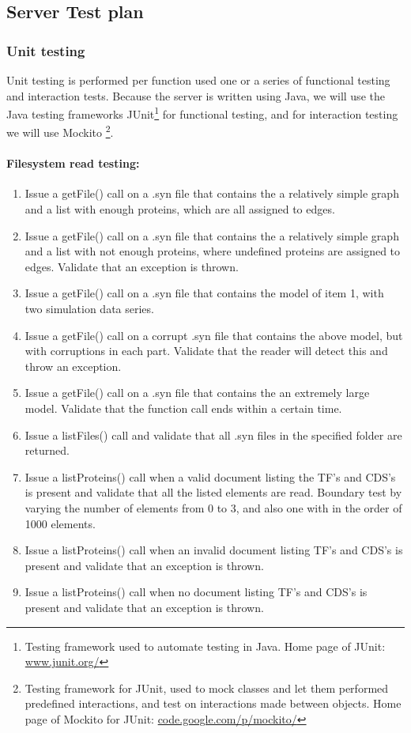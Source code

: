 \subsection{Server Test plan}

\subsubsection{Unit testing}
Unit testing is performed per function used one or a series of functional testing and interaction tests. Because the server is written using Java, we will use the Java testing frameworks JUnit\footnote{Testing framework used to automate testing in Java. Home page of JUnit: \url{www.junit.org/}} for functional testing, and for interaction testing we will use Mockito \footnote{Testing framework for JUnit, used to mock classes and let them performed predefined interactions, and test on interactions made between objects. Home page of Mockito for JUnit: \url{code.google.com/p/mockito/}}.

\paragraph{Filesystem read testing:}

\begin{enumerate}
\item Issue a getFile() call on a .syn file that contains the a relatively simple graph  and a list with enough proteins, which are all assigned to edges.

\item Issue a getFile() call on a .syn file that contains the a relatively simple graph  and a list with not enough proteins, where undefined proteins are assigned to edges. Validate that an exception is thrown.\item Issue a getFile() call on  a .syn file that contains the  model of item 1, with two simulation data series.
\item Issue a getFile() call on  a corrupt .syn file that contains the above model, but with corruptions in each part.
Validate that the reader will detect this and throw an exception.
\item Issue a getFile() call on  a .syn file that contains the an extremely large model. Validate that the function call ends within a certain time. 
\item Issue a listFiles() call and validate that all .syn files in the specified folder are returned.

\item Issue a listProteins() call when a valid document listing the TF's and CDS's is present and validate that all the listed elements are read.
 Boundary test by varying the number of elements from 0 to 3, and also one with in the order of 1000 elements.\item Issue a listProteins() call when an  invalid document listing TF's and CDS's is present and validate that an exception is thrown.
\item Issue a listProteins() call when no document listing TF's and CDS's is present and validate that an exception is thrown.\end{enumerate}

